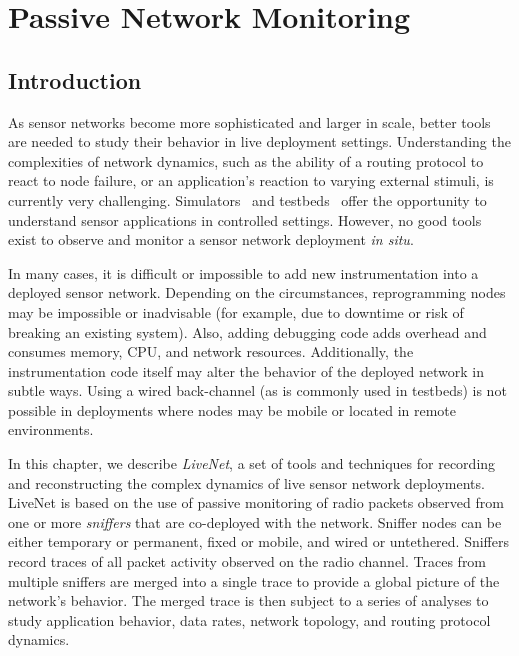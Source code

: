 \chapter{Passive Network Monitoring}
\label{chap-livenet}


\section{Introduction}
\label{sec-livenet-intro}

As sensor networks become more sophisticated and larger in scale,
better tools are needed to study their behavior in live deployment 
settings. Understanding the complexities of network dynamics, such 
as the ability of a routing protocol to react to node failure, 
or an application's reaction to varying external stimuli,
is currently very challenging. Simulators~\cite{tossim,avrora} and 
testbeds~\cite{motelab,mirage} offer the
opportunity to understand sensor applications in controlled settings.
However, no good tools exist to observe and monitor a sensor 
network deployment {\em in situ}.

In many cases, it is difficult or impossible to add new
instrumentation into a deployed sensor network. Depending on the
circumstances, reprogramming nodes may be impossible or inadvisable
(for example, due to downtime or risk of breaking an existing system). 
Also, adding debugging code adds overhead and consumes memory, CPU, and
network resources. Additionally, the instrumentation code itself 
may alter the behavior of the deployed network in subtle ways.
Using a wired back-channel (as is commonly used in testbeds) 
is not possible in deployments where nodes may be mobile or
located in remote environments.

In this chapter, we describe {\em LiveNet}, a set of tools and techniques
for recording and reconstructing the complex dynamics of live sensor network
deployments. LiveNet is based on the use of passive monitoring of radio
packets observed from one or more {\em sniffers} that are co-deployed with the
network. Sniffer nodes can be
either temporary or permanent, fixed or mobile, and 
wired or untethered. 
Sniffers record traces of all packet activity observed on the
radio channel.
Traces from multiple sniffers are merged into a single
trace to provide a global picture of the network's behavior. The
merged trace is then subject to a series of analyses to study
application behavior, data rates, network topology, and routing protocol 
dynamics. 

